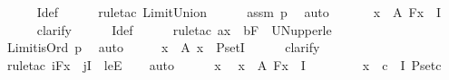 \begin{isabellebody}
\ \ \ \ \isamarkupfalse%
\ I{\isacharunderscore}{\kern0pt}def\isanewline
\ \ \ \ \isamarkupfalse%
\ {\isacharparenleft}{\kern0pt}rule{\isacharunderscore}{\kern0pt}tac\ Limit{\isacharunderscore}{\kern0pt}Union{\isacharparenright}{\kern0pt}\isanewline
\ \ \ \ \isamarkupfalse%
\ assm\ p{}\ \isamarkupfalse%
\ auto\isanewline
\ \ \isamarkupfalse%
\ \isamarkupfalse%
\ {\isachardoublequoteopen}{\isasymforall}\ x\ {\isasymin}\ A{\isachardot}{\kern0pt}\ F{\isacharparenleft}{\kern0pt}x{\isacharparenright}{\kern0pt}\ {\isasymle}\ I{\isachardoublequoteclose}\ \isanewline
\ \ \ \ \isamarkupfalse%
\ clarify\isanewline
\ \ \ \ \isamarkupfalse%
\ I{\isacharunderscore}{\kern0pt}def\isanewline
\ \ \ \ \isamarkupfalse%
\ {\isacharparenleft}{\kern0pt}rule{\isacharunderscore}{\kern0pt}tac\ a{\isacharequal}{\kern0pt}x\ \ b{\isacharequal}{\kern0pt}F\ \ UN{\isacharunderscore}{\kern0pt}upper{\isacharunderscore}{\kern0pt}le{\isacharparenright}{\kern0pt}\ \isanewline
\ \ \ \ \isamarkupfalse%
\ Limit{\isacharunderscore}{\kern0pt}is{\isacharunderscore}{\kern0pt}Ord\ p{}\ \isamarkupfalse%
\ auto\isanewline
\ \ \isamarkupfalse%
\ \isamarkupfalse%
\ {\isachardoublequoteopen}{\isasymforall}x\ {\isasymin}\ A{\isachardot}{\kern0pt}\ x\ {\isasymin}\ P{\isacharunderscore}{\kern0pt}set{\isacharparenleft}{\kern0pt}I{\isacharparenright}{\kern0pt}{\isachardoublequoteclose}\isanewline
\ \ \ \ \isamarkupfalse%
\ clarify\isanewline
\ \ \ \ \isamarkupfalse%
\ {\isacharparenleft}{\kern0pt}rule{\isacharunderscore}{\kern0pt}tac\ i{\isacharequal}{\kern0pt}{\isachardoublequoteopen}F{\isacharparenleft}{\kern0pt}x{\isacharparenright}{\kern0pt}{\isachardoublequoteclose}\ \ j{\isacharequal}{\kern0pt}I\ \ leE{\isacharparenright}{\kern0pt}\isanewline
\ \ \isamarkupfalse%
\ {\isacharparenleft}{\kern0pt}auto{\isacharparenright}{\kern0pt}\isanewline
\ \ \ \ \isamarkupfalse%
\ x\ \isamarkupfalse%
\ {\isachardoublequoteopen}x\ {\isasymin}\ A{\isachardoublequoteclose}\ {\isachardoublequoteopen}F{\isacharparenleft}{\kern0pt}x{\isacharparenright}{\kern0pt}\ {\isacharless}{\kern0pt}\ I{\isachardoublequoteclose}\ \isanewline
\ \ \ \ \isamarkupfalse%
\ \isamarkupfalse%
\ {\isachardoublequoteopen}x\ {\isasymin}\ {\isacharparenleft}{\kern0pt}{\isasymUnion}c\ {\isacharless}{\kern0pt}\ I{\isachardot}{\kern0pt}\ P{\isacharunderscore}{\kern0pt}set{\isacharparenleft}{\kern0pt}c{\isacharparenright}{\kern0pt}{\isacharparenright}{\kern0pt}{\isachardoublequoteclose}\ \isanewline

\end{isabellebody}

